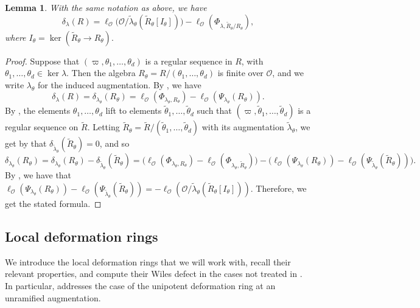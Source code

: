 \documentclass[a4paper, notitlepage, 10pt]{amsart}
\theoremstyle{plain} %
\newtheorem{lemma}[theorem]{Lemma}
\theoremstyle{definition} %
\theoremstyle{remark} %
\numberwithin{equation}{section}
\begin{document}
\begin{lemma}\label{formulaWD}
    With the same notation as above, we have
\begin{equation*}
    \delta_{\lambda}(R)=\ell_{\mathcal{O}}\big(\mathcal{O}/\widetilde{\lambda}_\theta(\widetilde{R}_{\theta}[I_\theta])\big)-\ell_{\mathcal{O}}(\Phi_{\lambda,\widetilde{R}_\theta/R_\theta}),
\end{equation*}
where $I_{\theta}=\ker(\widetilde{R}_{\theta}\to R_{\theta}).$
\end{lemma}
\begin{proof}
    Suppose that $(\varpi,\theta_1,\dots,\theta_d)$ is a regular sequence in $R$, with $\theta_1,\dots,\theta_d\in \ker \lambda$. Then the algebra $R_\theta=R/(\theta_1,\dots,\theta_d)$ is finite over $\mathcal{O}$, and we write $\lambda_\theta$ for the induced augmentation. By , we have 
$$ \delta_\lambda(R)=\delta_{\lambda_\theta}(R_\theta)= \ell_{\mathcal{O}}(\Phi_{\lambda_\theta,R_\theta})-\ell_{\mathcal{O}}(\Psi_{\lambda_\theta}(R_\theta)).$$
By \cite[Lemma 3.7]{BKM2}, the elements $\theta_1,\dots,\theta_d$ lift to elements $\widetilde{\theta}_1,\dots,\widetilde{\theta}_d$ such that $(\varpi, \widetilde{\theta}_1,\dots,\widetilde{\theta}_d)$ is a regular sequence on $\widetilde{R}$. Letting $\widetilde{R}_\theta=\widetilde{R}/(\widetilde{\theta}_1,\dots,\widetilde{\theta}_d)$ with its augmentation $\widetilde{\lambda}_\theta$, we get by  that $\delta_{\widetilde{\lambda}_\theta}(\widetilde{R}_\theta)=0$, and so
$$ \delta_{\lambda_\theta}(R_\theta)=\delta_{\lambda_\theta}(R_\theta)-\delta_{\widetilde{\lambda}_\theta}(\widetilde{R}_\theta)=\big(\ell_{\mathcal{O}}(\Phi_{\lambda_\theta, R_\theta})-\ell_{\mathcal{O}}(\Phi_{\lambda_\theta,\widetilde{R}_\theta})\big)-\big(\ell_{\mathcal{O}}(\Psi_{\lambda_\theta}(R_\theta))-\ell_{\mathcal{O}}(\Psi_{\widetilde{\lambda}_\theta}(\widetilde{R}_\theta))\big).$$
By \cite[Lemma A.10]{FKR}, we have that $\ell_{\mathcal{O}}(\Psi_{\lambda_\theta}(R_\theta))-\ell_{\mathcal{O}}(\Psi_{\widetilde{\lambda}_\theta}(\widetilde{R}_\theta))=-\ell_{\mathcal{O}}(\mathcal{O}/\widetilde{\lambda}_\theta(\widetilde{R}_\theta[I_\theta]))$. Therefore, we get the stated formula.
\end{proof}

\subsection{Local deformation rings}\label{localdefring} We introduce the local deformation rings that we will work with, recall their relevant properties, and compute their Wiles defect in the cases not treated in \cite{BKM2}. In particular,  addresses the case of the unipotent deformation ring at an unramified augmentation.
\end{document}
